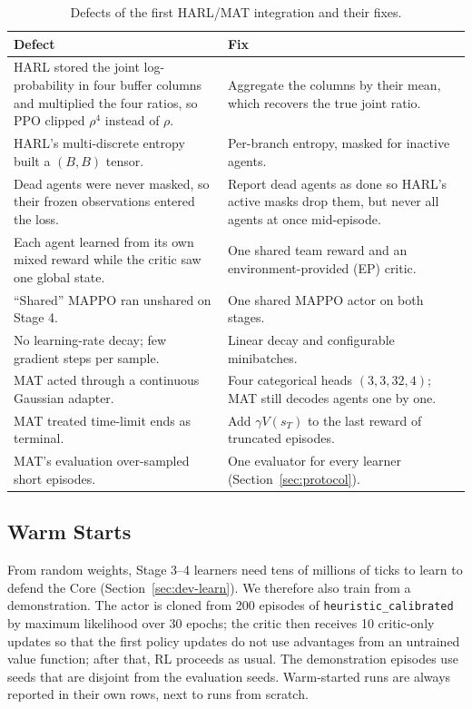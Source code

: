 \documentclass[11pt]{article}
\begin{document}
\begin{table}[t]
\centering
\caption{Defects of the first HARL/MAT integration and their fixes.}
\label{tab:defects}
\small
\begin{tabular}{@{}p{}p{}@{}}
\toprule
Defect & Fix \\
\midrule
HARL stored the joint log-probability in four buffer columns and multiplied the four ratios, so PPO clipped $\rho^4$ instead of $\rho$. & Aggregate the columns by their mean, which recovers the true joint ratio. \\
HARL's multi-discrete entropy built a $(B, B)$ tensor. & Per-branch entropy, masked for inactive agents. \\
Dead agents were never masked, so their frozen observations entered the loss. & Report dead agents as done so HARL's active masks drop them, but never all agents at once mid-episode. \\
Each agent learned from its own mixed reward while the critic saw one global state. & One shared team reward and an environment-provided (EP) critic. \\
``Shared'' MAPPO ran unshared on Stage 4. & One shared MAPPO actor on both stages. \\
No learning-rate decay; few gradient steps per sample. & Linear decay and configurable minibatches. \\
MAT acted through a continuous Gaussian adapter. & Four categorical heads $(3, 3, 32, 4)$; MAT still decodes agents one by one. \\
MAT treated time-limit ends as terminal. & Add $\gamma V(s_T)$ to the last reward of truncated episodes. \\
MAT's evaluation over-sampled short episodes. & One evaluator for every learner (Section~\ref{sec:protocol}). \\
\bottomrule
\end{tabular}
\end{table}

\subsection{Warm Starts}

From random weights, Stage 3--4 learners need tens of millions of ticks to learn to defend the Core (Section~\ref{sec:dev-learn}). We therefore also train from a demonstration. The actor is cloned from 200 episodes of \texttt{heuristic\_calibrated} by maximum likelihood over 30 epochs; the critic then receives 10 critic-only updates so that the first policy updates do not use advantages from an untrained value function; after that, RL proceeds as usual. The demonstration episodes use seeds that are disjoint from the evaluation seeds. Warm-started runs are always reported in their own rows, next to runs from scratch.
\end{document}
